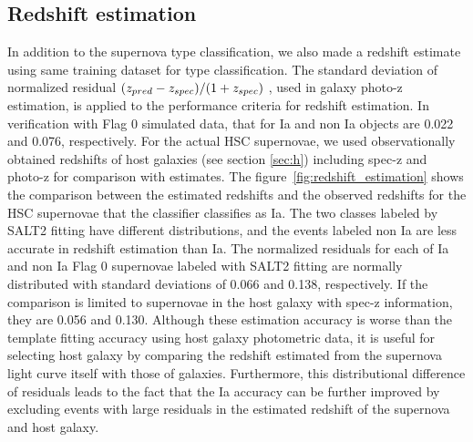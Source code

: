 \documentclass[useamsfonts]{pasj01}
\begin{document}
\subsection{Redshift estimation}
%
In addition to the supernova type classification,
we also made a redshift estimate using same training dataset for type classification.
The standard deviation of normalized residual $(z_{\rm pred}-z_{\rm spec})/(1+z_{\rm spec})$ \citep{Salvato_2009,Salvato_2019}, used in galaxy photo-z estimation, is applied to the performance criteria for redshift estimation.
In verification with Flag 0 simulated data, that for Ia and non Ia objects are 0.022 and 0.076, respectively.
For the actual HSC supernovae, we used observationally obtained redshifts of host galaxies (see section \ref{sec:h}) including spec-z and photo-z for comparison with estimates.
The figure\ \ref{fig:redshift_estimation} shows the comparison between the estimated redshifts and the observed redshifts for the HSC supernovae that the classifier classifies as Ia.
The two classes labeled by SALT2 fitting have different distributions, and the events labeled non Ia are less accurate in redshift estimation than Ia.
The normalized residuals for each of Ia and non Ia Flag 0 supernovae labeled with SALT2 fitting are normally distributed with standard deviations of 0.066 and 0.138, respectively.
If the comparison is limited to supernovae in the host galaxy with spec-z information, they are 0.056 and 0.130.
Although these estimation accuracy is worse than the template fitting accuracy using host galaxy photometric data, it is useful for selecting host galaxy by comparing the redshift estimated from the supernova light curve itself with those of galaxies.
Furthermore, this distributional difference of residuals leads to the fact that the Ia accuracy can be further improved by excluding events with large residuals in the estimated redshift of the supernova and host galaxy.
%
\end{document}
